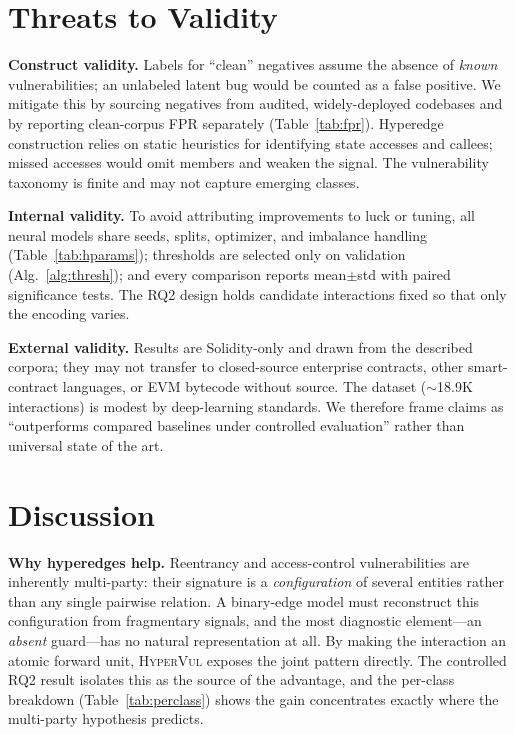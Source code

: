 \documentclass[conference]{IEEEtran}
\newcommand{\hypervul}{\textsc{HyperVul}}
\begin{document}
\section{Threats to Validity}
\label{sec:threats}

\noindent\textbf{Construct validity.} Labels for ``clean'' negatives assume the
absence of \emph{known} vulnerabilities; an unlabeled latent bug would be counted as a
false positive. We mitigate this by sourcing negatives from audited, widely-deployed
codebases and by reporting clean-corpus FPR separately
(Table~\ref{tab:fpr}). Hyperedge construction relies on static heuristics for
identifying state accesses and callees; missed accesses would omit members and weaken
the signal. The vulnerability taxonomy is finite and may not capture emerging classes.

\noindent\textbf{Internal validity.} To avoid attributing improvements to luck or
tuning, all neural models share seeds, splits, optimizer, and imbalance handling
(Table~\ref{tab:hparams}); thresholds are selected only on validation
(Alg.~\ref{alg:thresh}); and every comparison reports mean$\pm$std with paired
significance tests. The RQ2 design holds candidate interactions fixed so that only the
encoding varies.

\noindent\textbf{External validity.} Results are Solidity-only and drawn from the
described corpora; they may not transfer to closed-source enterprise contracts, other
smart-contract languages, or EVM bytecode without source. The dataset
($\sim$18.9K interactions) is modest by deep-learning standards. We therefore frame
claims as ``outperforms compared baselines under controlled evaluation'' rather than
universal state of the art.

\section{Discussion}
\label{sec:discussion}

\noindent\textbf{Why hyperedges help.} Reentrancy and access-control vulnerabilities
are inherently multi-party: their signature is a \emph{configuration} of several
entities rather than any single pairwise relation. A binary-edge model must
reconstruct this configuration from fragmentary signals, and the most diagnostic
element---an \emph{absent} guard---has no natural representation at all. By making the
interaction an atomic forward unit, \hypervul{} exposes the joint pattern directly.
The controlled RQ2 result isolates this as the source of the advantage, and the
per-class breakdown (Table~\ref{tab:perclass}) shows the gain concentrates exactly
where the multi-party hypothesis predicts.
\end{document}
